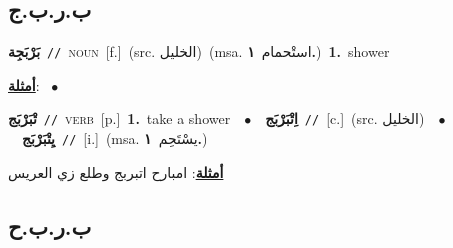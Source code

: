 \documentclass[10pt,a4paper,twoside]{article} %
\begin{document}
\begin{multicols}{2}
\vspace{-3mm}
\subsection*{\color{blue}\foreignlanguage{arabic}{ب.ر.ب.ج}\color{blue}{}} 

{\setlength\topsep{0pt}\textbf{\foreignlanguage{arabic}{بَرْبَجِة}}\ {\color{gray}\texttt{//}\color{black}}\ \textsc{noun}\ [f.]\ (src. \color{gray}\foreignlanguage{arabic}{الخليل}\color{black})\ \color{gray}(msa. \foreignlanguage{arabic}{استْحمام}~\foreignlanguage{arabic}{\textbf{١.}})\color{black}\ \textbf{1.}~shower\  \begin{flushright}\color{gray}\foreignlanguage{arabic}{\textbf{\underline{\foreignlanguage{arabic}{أمثلة}}}: \ $\bullet$\ \  }\end{flushright}\color{black}} \vspace{2mm}

{\setlength\topsep{0pt}\textbf{\foreignlanguage{arabic}{تْبَرْبَج}}\ {\color{gray}\texttt{//}\color{black}}\ \textsc{verb}\ [p.]\ \textbf{1.}~take a shower\ \ $\bullet$\ \ \setlength\topsep{0pt}\textbf{\foreignlanguage{arabic}{اِتْبَرْبَج}}\ {\color{gray}\texttt{//}\color{black}}\ [c.]\ (src. \color{gray}\foreignlanguage{arabic}{الخليل}\color{black})\ \ $\bullet$\ \ \setlength\topsep{0pt}\textbf{\foreignlanguage{arabic}{يِتْبَرْبَج}}\ {\color{gray}\texttt{//}\color{black}}\ [i.]\ \color{gray}(msa. \foreignlanguage{arabic}{يسْتَحِم}~\foreignlanguage{arabic}{\textbf{١.}})\color{black}\  \begin{flushright}\color{gray}\foreignlanguage{arabic}{\textbf{\underline{\foreignlanguage{arabic}{أمثلة}}}: امبارح اتبربج وطلع زي العريس}\end{flushright}\color{black}} \vspace{2mm}

\vspace{-3mm}
\subsection*{\color{blue}\foreignlanguage{arabic}{ب.ر.ب.ح}\color{blue}{}} 


\end{multicols}
\end{document}
